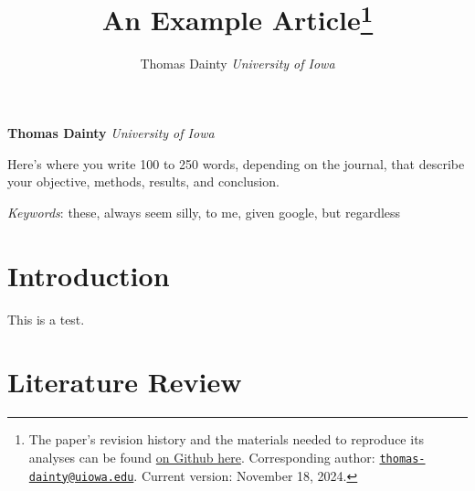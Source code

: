 \documentclass[11pt,]{article}
\title{An Example Article\thanks{The paper's revision history and the
materials needed to reproduce its analyses can be found
\href{http://github.com/tdainty/example_article}{on Github here}.
Corresponding author:
\href{mailto:thomas-dainty@uiowa.edu}{\nolinkurl{thomas-dainty@uiowa.edu}}.
Current version: November 18, 2024.}  }
\author{\Large Thomas
Dainty\vspace{0.05in} \newline\normalsize\emph{University of Iowa}  }
\date{}
\newcommand*{\authorfont}{\fontfamily{phv}\selectfont}
\renewenvironment{abstract}
 {{%
    \setlength{\leftmargin}{0mm}
    \setlength{\rightmargin}{\leftmargin}%
  }%
  \relax}
 {\endlist}
\begin{document}
	
%    


{%
\setlength{\parindent}{0pt}
\thispagestyle{plain}
{\fontsize{18}{20}\selectfont\raggedright 
\maketitle  %

}

{
   \vskip 13.5pt\relax \normalsize\fontsize{11}{12} 
\textbf{\authorfont Thomas Dainty} \hskip 15pt \emph{\small University
of Iowa}   

}

}








\begin{abstract}

    \hbox{\vrule height .2pt width 39.14pc}

    \vskip 8.5pt %

\noindent Here's where you write 100 to 250 words, depending on the
journal, that describe your objective, methods, results, and conclusion.


\vskip 8.5pt \noindent \emph{Keywords}: these, always seem silly, to me,
given google, but regardless \par

    \hbox{\vrule height .2pt width 39.14pc}



\end{abstract}


\vskip 6.5pt


\noindent \singlespacing \section{Introduction}\label{introduction}

This is a test.

\section{Literature Review}\label{literature-review}
\end{document}
